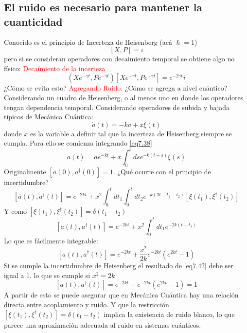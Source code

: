 \documentclass{book}
\begin{document}
\subsection{El ruido es necesario para mantener la cuanticidad}
Conocido es el principio de Incerteza de Heisenberg (acá $\hslash=1$)
\begin{equation}\label{eq7.36}[X,P]=i\end{equation}  pero si se consideran operadores con decaimiento temporal se obtiene algo no físico: \textcolor{red}{Decaímiento de la incerteza}
\begin{equation}\label{eq7.37}(Xe^{-\gamma t}, Pe^{-\gamma t}) [Xe^{-\gamma t}, Pe^{-\gamma t}]=e^{-2\gamma t}i\end{equation}
¿Cómo se evita esto? \textcolor{red}{Agregando Ruido}. ¿Cómo se agrega a nivel cuántico? Considerando un cuadro de Heisenberg, o al menos uno en donde los operadores tengan dependencia temporal. Considerando operadores de subida y bajada típicos de Mecánica Cuántica:
 \begin{equation} \label{eq7.38}\dot{a}(t)=-ka+x\xi(t)\end{equation}
donde $x$ es la variable a definir tal que la incerteza de Heisenberg siempre se cumpla. Para ello se comienza integrando \ref{eq7.38} 
\begin{equation}\label{eq7.39} a(t)=ae^{-kt} +x \int_0^t ds e^{-k(t-s)}\xi(s)\end{equation}
Originalmente $[a(0),a^\dag(0)]=1$. ¿Qué ocurre con el principio de incertidumbre?
\begin{equation}\label{eq7.40}[a(t),a^\dag(t)]=e^{-2kt}+x^2\int_0^t dt_1\int_0^t dt_2 e^{-k(2t-t_1-t_2)}[\xi(t_1),\xi^\dag(t_2)]\end{equation}
Y como $[\xi(t_1),\xi^\dag(t_2)]=\delta(t_1-t_2)$
\begin{equation}\label{eq7.41}[a(t),a^\dag(t)]=e^{-2kt}+x^2\int_0^t dt_1 e^{-2k(t-t_1)}\end{equation}
Lo que es fácilmente integrable:
\begin{equation}\label{eq7.42}[a(t),a^\dag(t)]=e^{-2kt}+\frac{x^2}{2k}e^{-2kt}(e^{2kt}-1)\end{equation}
Si se cumple la incertidumbre de Heisenberg el resultado de \ref{eq7.42} debe ser igual a 1. lo que se cumple si $x^2=2k$
\begin{equation}\label{eq7.43}[a(t),a^\dag(t)]=e^{-2kt}+e^{-2kt}(e^{2kt}-1)=1\end{equation}
A partir de esto se puede asegurar que en Mecánica Cuántica hay una relación directa entre acoplamiento y ruido. Y que la restricción $[\xi(t_1),\xi^\dag(t_2)]=\delta(t_1-t_2)$ implica la existencia de ruido blanco, lo que parece una aproximación adecuada al ruido en sistemas cuánticos. 
\end{document}
